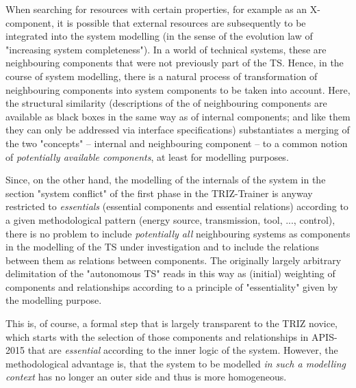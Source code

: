 \documentclass[11pt,a4paper]{article}
\begin{document}
When searching for resources with certain properties, for example as an
X-component, it is possible that external resources are subsequently to be
integrated into the system modelling (in the sense of the evolution law of
"increasing system completeness"). In a world of technical systems, these are
neighbouring components that were not previously part of the TS.  Hence, in
the course of system modelling, there is a natural process of transformation
of neighbouring components into system components to be taken into account.
Here, the structural similarity (descriptions of the of neighbouring
components are available as black boxes in the same way as of internal
components; and like them they can only be addressed via interface
specifications) substantiates a merging of the two "concepts" -- internal and
neighbouring component -- to a common notion of \emph{potentially available
  components}, at least for modelling purposes.

Since, on the other hand, the modelling of the internals of the system in the
section "system conflict" of the first phase in the TRIZ-Trainer is anyway
restricted to \emph{essentials} (essential components and essential relations)
according to a given methodological pattern (energy source, transmission,
tool, ..., control), there is no problem to include \emph{potentially all}
neighbouring systems as components in the modelling of the TS under
investigation and to include the relations between them as relations between
components.  The originally largely arbitrary delimitation of the "autonomous
TS" reads in this way as (initial) weighting of components and relationships
according to a principle of "essentiality" given by the modelling purpose.

This is, of course, a formal step that is largely transparent to the TRIZ
novice, which starts with the selection of those components and relationships
in APIS-2015 that are \emph{essential} according to the inner logic of the
system.  However, the methodological advantage is, that the system to be
modelled \emph{in such a modelling context} has no longer an outer side and
thus is more homogeneous.
\end{document}
